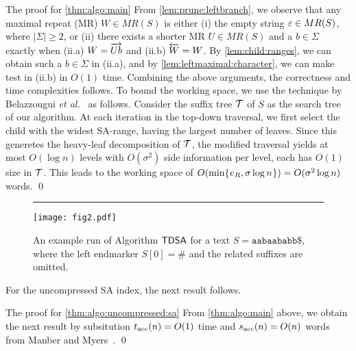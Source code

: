 \begin{statement}{The proof for \cref{thm:algo:main}}
  From \cref{lem:prune:leftbranch}, we observe that any maximal repeat (MR) $W \in MR(S)$ is either (i) the empty string $\varepsilon \in MR(S)$, where $|\Sigma|\ge 2$, or (ii) there exists a shorter MR $U \in MR(S)$ and a $b \in \Sigma$ exactly when (ii.a) $W = \overrightarrow{Ub}$ and (ii.b) $\overleftarrow{W} = W$.
  By \cref{lem:child:ranges}, we can obtain such a $b \in \Sigma$ in (ii.a), and by \cref{lem:leftmaximal:character}, we can make test in (ii.b) in $O(1)$ time. 
  Combining the above arguments, the correctness and time complexities follows. 
  To bound the working space, we use the technique by Belazzougui \textit{et al.}~\cite[Lemma~4.2]{belazzougui2020linear} as follows. Consider the suffix tree $\mathcal{T}$ of $S$ as the search tree of our algorithm. At each iteration in the top-down traversal, we first select the child with the widest SA-range, having the largest number of leaves. Since this generetes the heavy-leaf decomposition of $\mathcal{T}$, the modified traversal yields at most $O(\log n)$ levels with $O(\sigma^2)$ side information per level, each has $O(1)$ size in $\mathcal{T}$. This leads to the working space of $O(\min\{\kern0.05eme_R, \sigma\log n\kern0.05em\}) = O(\sigma^2\log n)$ words. \qed 
\end{statement}

\begin{figure}[t]
  \centering
  \rule{0.09\textwidth}{0em}
\texttt{[image: fig2.pdf]}
\vspace{.75\baselineskip}
\caption{An example run of Algorithm $\textsf{TDSA}$ for a text $S = \mathtt{aabaababb\$}$, where the left endmarker $S[0]=\#$ and the related suffixes are omitted. 
}\label{fig:run:example}
\end{figure}


For the uncompressed SA index, the next result follows. 

\begin{statement}{The proof for \cref{thm:algo:uncompressed:sa}}
  From \cref{thm:algo:main} above, we obtain the next result by subsitution $t_{\mathrm{acc}}(n) = O(1)$ time and $s_{\mathrm{acc}}(n) = O(n)$ words from Manber and Myers~\cite{manber:myers1993suffixarrays}.
  \qed 
\end{statement}


